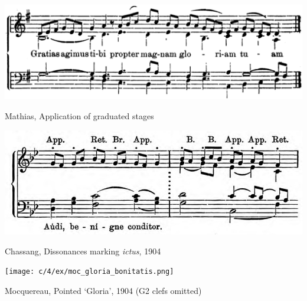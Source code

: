 \vspace*{\fill}

\newpage

\vspace*{\fill}

\begin{example}
  \centering
  \includegraphics[width=.8\linewidth]{c/4/ex/mathias_messvesper_16.png}
  \caption{Mathias, Application of graduated stages}
  \label{mus:mathias_gratias}
\end{example}

\vspace*{\fill}


\begin{example}
  \centering
  \includegraphics[width=.8\linewidth]{c/4/ex/chassang_dissonances.jpg}
  \caption{Chassang, Dissonances marking \emph{ictus}, 1904}
  \label{mus:chassang_dissonances}
\end{example}

\vspace*{\fill}

\begin{landscape}

  \vspace*{\fill}

  \begin{example}
    \centering
    \texttt{[image: c/4/ex/moc\_gloria\_bonitatis.png]}
    \caption{Mocquereau, Pointed `Gloria', 1904 (G2 clefs omitted)}
    \label{mus:moc_gloria_bonitatis}
  \end{example}

  \vspace*{\fill}

\end{landscape}



